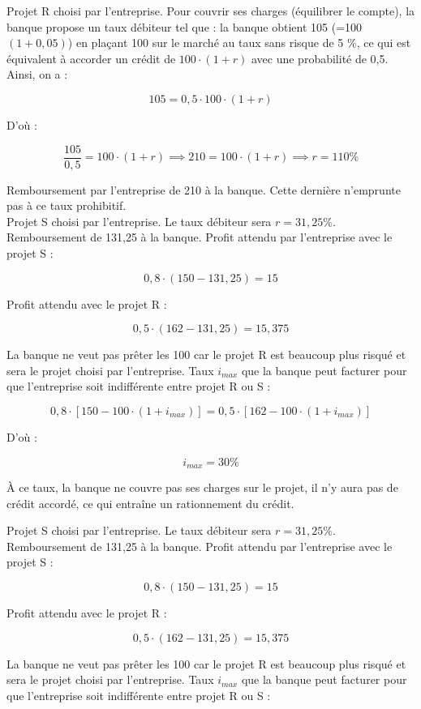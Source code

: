 \documentclass[a4paper, 12pt]{report}
\begin{document}
Projet R choisi par l'entreprise. Pour couvrir ses charges (équilibrer le compte), la banque propose un taux débiteur tel que : la banque obtient 105 (=100\((1+0,05)\)) en plaçant 100 sur le marché au taux sans risque de 5 \%, ce qui est équivalent à accorder un crédit de \( 100 \cdot (1+r) \) avec une probabilité de 0,5. Ainsi, on a :

\[
105 = 0,5 \cdot 100 \cdot (1+r)
\]

D'où :

\[
\frac{105}{0,5} = 100 \cdot (1+r) \implies 210 = 100 \cdot (1+r) \implies r = 110\%
\]

Remboursement par l’entreprise de 210 à la banque. Cette dernière n’emprunte pas à ce taux prohibitif.\\

Projet S choisi par l’entreprise. Le taux débiteur sera \( r = 31,25 \% \). Remboursement de 131,25 à la banque. Profit attendu par l’entreprise avec le projet S : 

\[
0,8 \cdot (150 - 131,25) = 15
\]

Profit attendu avec le projet R : 

\[
0,5 \cdot (162 - 131,25) = 15,375
\]

La banque ne veut pas prêter les 100 car le projet R est beaucoup plus risqué et sera le projet choisi par l’entreprise. Taux \( i_{max} \) que la banque peut facturer pour que l’entreprise soit indifférente entre projet R ou S :

\[
0,8 \cdot [150 - 100 \cdot (1+i_{max})] = 0,5 \cdot [162 - 100 \cdot (1+i_{max})]
\]

D'où : 

\[
i_{max} = 30 \%
\]

À ce taux, la banque ne couvre pas ses charges sur le projet, il n’y aura pas de crédit accordé, ce qui entraîne un rationnement du crédit.

Projet S choisi par l’entreprise. Le taux débiteur sera \( r = 31,25 \% \). Remboursement de 131,25 à la banque. Profit attendu par l’entreprise avec le projet S : 

\[
0,8 \cdot (150 - 131,25) = 15
\]

Profit attendu avec le projet R : 

\[
0,5 \cdot (162 - 131,25) = 15,375
\]

La banque ne veut pas prêter les 100 car le projet R est beaucoup plus risqué et sera le projet choisi par l’entreprise. Taux \( i_{max} \) que la banque peut facturer pour que l’entreprise soit indifférente entre projet R ou S :
\end{document}
